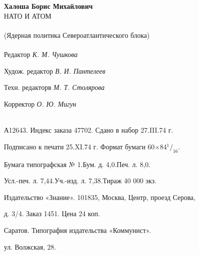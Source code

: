 \documentclass[12pt, a4paper, openany]{book}
\newcommand*\rfrac[2]{{}^{#1}\!/_{#2}}
\begin{document}
	\begin{center}
		\ \\
		\ \\
		\ \\
		\ \\
			\ \\
		\ \\
		\ \\
		\ \\
			\ \\
		\ \\
		\ \\
		\ \\
			\ \\
		\ \\
		\ \\
		\ \\
					\ \\
		\ \\
		\ \\
		\ \\
		\ \\
		\ \\
		\ \\
		\ \\
					\ \\
		\ \\
		\ \\
		\ \\
		\ \\
		\textbf{Халоша Борис Михайлович}
		\ \\
		НАТО И АТОМ
		\ \\
		\ \\
		(Ядерная политика Североатлантического блока)
		\ \\
\ \\		
		Редактор \textit{К. М. Чушкова}
		
		Худож. редактор \textit{В. И. Пантелеев}
		
		Техн. редакторв \textit{М. Т. Столярова}
		
		Корректор \textit{О. Ю. Мигун}
		\ \\
		\ \\
		
\hrulefill 
		
А12643. Индекс заказа 47702. Сдано в набор 27.III.74 г.

Подписано к печати 25.XI.74 г. Формат бумаги 60$\times$84$\rfrac{1}{16}$.

Бумага типографская № 1.\quad \quad Бум. д. 4,0.\quad \quad Печ. л. 8,0.

Усл.-печ. л. 7,44.\quad Уч.-изд. л. 7,38.\quad Тираж 40 000 экз.

Издательство «Знание». 101835, Москва, Центр, проезд Серова,

д. 3/4. Заказ 1451. Цена 24 коп.

\hrulefill 

Саратов. Типография издательства «Коммунист».

ул. Волжская, 28.
		
	\end{center}
	\thispagestyle{empty} %
	
\end{document}
